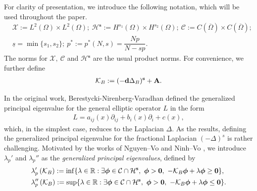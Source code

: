 \documentclass[a4paper,11pt]{amsart}
\theoremstyle{definition}
\def\R{\mathbb{R}}
\def\O{\Omega}
\numberwithin{equation}{section}
\theoremstyle{definition}
\def\O{\Omega}
\begin{document}



For clarity of presentation, we introduce the following notation, which will be used throughout the paper.
\begin{align*}
&\mathcal{X}:=L^2(\O)\times L^2(\O);~ \mathcal{H}^{\textbf{s}}:=H^{s_1}{(\O)}\times H^{s_2}{(\O)};~\mathcal{C}:=C(\overline{\O})\times C(\overline{\O});\\
&\underline{s}=\min\{s_1,s_2\};~p^*:=p^*(N,s)=\dfrac{Np}{N-sp}.
\end{align*}
The norms for $\mathcal{X},~\mathcal{C}$ and $\mathcal{H}^{\textbf{s}}$ are the usual product norms. For convenience, we further define
\begin{align*}
\mathcal{K}_B:=(-\textbf{d}\Delta_B)^{\textbf{s}} + {\bf A}.
\end{align*}

In the original work, Berestycki-Nirenberg-Varadhan \cite{berestycki_nirenberg_varadhan_1994} defined the generalized principal eigenvalue for the general elliptic operator $L$ in the form
\begin{align*}
L=a_{ij}(x)\partial_{ij}+b_i(x)\partial_i+c(x),
\end{align*}
which, in the simplest case, reduces to the Laplacian $\Delta$. As the results, defining the generalized principal eigenvalue for the fractional Laplacian $(-\Delta)^s$ is rather challenging. Motivated by the works of Nguyen–Vo \cite{nguyen_dynamics_2022} and Ninh–Vo \cite{ninh_vo_asymptotic_2025}, we introduce $\lambda_p'$ and $\lambda_p''$ as the \emph{generalized principal eigenvalues}, defined by
\begin{align*}
&\lambda_p'\left(\mathcal{K}_B\right) := \inf\{\lambda\in \R:\exists \boldsymbol{\phi}\in \mathcal{C}\cap \mathcal{H}^{\bf s},~\boldsymbol{\phi}>{\bf 0},~-\mathcal{K}_B{\bf \boldsymbol{\phi}}+\lambda\boldsymbol{\phi} \geq  {\bf 0} \},\\
&\lambda_p''\left(\mathcal{K}_B\right) := \sup\{\lambda\in \R:\exists \boldsymbol{\phi}\in \mathcal{C}\cap \mathcal{H}^{\bf s},~\boldsymbol{\phi}>{\bf 0},~-\mathcal{K}_B {\bf \boldsymbol{\phi}}+\lambda\boldsymbol{\phi} \leq  {\bf 0} \}.
\end{align*}
\end{document}
